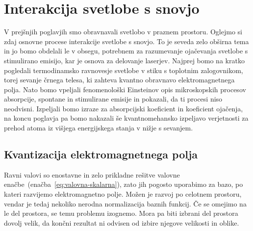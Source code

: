 \chapter{Interakcija svetlobe s snovjo}

V prejšnjih poglavjih smo obravnavali svetlobo v praznem prostoru. Oglejmo si
zdaj osnovne procese interakcije svetlobe s snovjo. To je seveda zelo
obširna tema in jo bomo obdelali le v obsegu, potrebnem za
razumevanje ojačevanja svetlobe s stimulirano emisijo, kar je osnova za
delovanje laserjev. Najprej bomo na kratko pogledali termodinamsko ravnovesje 
svetlobe v stiku s toplotnim zalogovnikom, torej sevanje črnega telesa, ki 
zahteva kvantno obravnavo elektromagnetnega polja. Nato bomo vpeljali fenomenološki
Einsteinov opis mikroskopskih procesov absorpcije, spontane in stimulirane
emisije in pokazali, da ti procesi niso neodvisni. Izpeljali bomo
izraze za absorpcijski koeficient in koeficient ojačenja, na koncu poglavja
pa bomo nakazali še kvantnomehansko izpeljavo verjetnosti za prehod
atoma iz višjega energijskega stanja v nižje s sevanjem.

\section{Kvantizacija elektromagnetnega polja}
Ravni valovi so enostavne in zelo prikladne rešitve valovne 
enačbe~(enačba~\ref{eq:valovna-skalarna}), zato jih pogosto uporabimo za 
bazo, po kateri razvijemo elektromagnetno polje. Možen je razvoj
po celotnem prostoru, vendar je tedaj nekoliko nerodna normalizacija baznih
funkcij. Če se omejimo na le del prostora, se temu problemu izognemo. Mora pa biti 
izbrani del prostora dovolj velik, da končni rezultat ni odvisen od izbire 
njegove velikosti in oblike.

